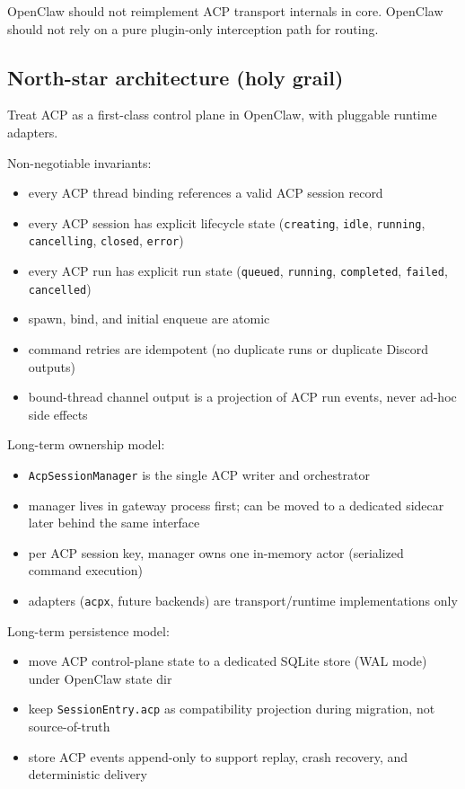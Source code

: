 OpenClaw should not reimplement ACP transport internals in core.
OpenClaw should not rely on a pure plugin-only interception path for routing.

\subsection{North-star architecture (holy grail)}


Treat ACP as a first-class control plane in OpenClaw, with pluggable runtime adapters.

Non-negotiable invariants:

\begin{itemize}
  \item every ACP thread binding references a valid ACP session record
  \item every ACP session has explicit lifecycle state (\texttt{creating}, \texttt{idle}, \texttt{running}, \texttt{cancelling}, \texttt{closed}, \texttt{error})
  \item every ACP run has explicit run state (\texttt{queued}, \texttt{running}, \texttt{completed}, \texttt{failed}, \texttt{cancelled})
  \item spawn, bind, and initial enqueue are atomic
  \item command retries are idempotent (no duplicate runs or duplicate Discord outputs)
  \item bound-thread channel output is a projection of ACP run events, never ad-hoc side effects
\end{itemize}


Long-term ownership model:

\begin{itemize}
  \item \texttt{AcpSessionManager} is the single ACP writer and orchestrator
  \item manager lives in gateway process first; can be moved to a dedicated sidecar later behind the same interface
  \item per ACP session key, manager owns one in-memory actor (serialized command execution)
  \item adapters (\texttt{acpx}, future backends) are transport/runtime implementations only
\end{itemize}


Long-term persistence model:

\begin{itemize}
  \item move ACP control-plane state to a dedicated SQLite store (WAL mode) under OpenClaw state dir
  \item keep \texttt{SessionEntry.acp} as compatibility projection during migration, not source-of-truth
  \item store ACP events append-only to support replay, crash recovery, and deterministic delivery
\end{itemize}



